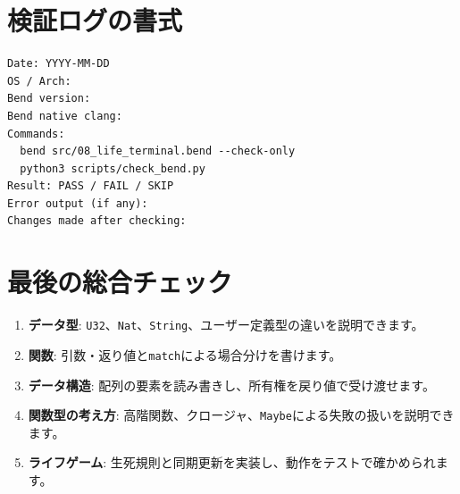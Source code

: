 \documentclass[11pt,a4paper,openany]{book}
\newcommand{\code}[1]{\texttt{#1}}
\begin{document}
\section{検証ログの書式}
\begin{lstlisting}[language={},numbers=none,caption={VERSION\_LOG.mdの記入例（数値は実測値に置換）}]
Date: YYYY-MM-DD
OS / Arch:
Bend version:
Bend native clang:
Commands:
  bend src/08_life_terminal.bend --check-only
  python3 scripts/check_bend.py
Result: PASS / FAIL / SKIP
Error output (if any):
Changes made after checking:
\end{lstlisting}
\section{最後の総合チェック}
\begin{enumerate}
\item \textbf{データ型}: \code{U32}、\code{Nat}、\code{String}、ユーザー定義型の違いを説明できます。
\item \textbf{関数}: 引数・返り値と\code{match}による場合分けを書けます。
\item \textbf{データ構造}: 配列の要素を読み書きし、所有権を戻り値で受け渡せます。
\item \textbf{関数型の考え方}: 高階関数、クロージャ、\code{Maybe}による失敗の扱いを説明できます。
\item \textbf{ライフゲーム}: 生死規則と同期更新を実装し、動作をテストで確かめられます。
\end{enumerate}

\backmatter
\end{document}
